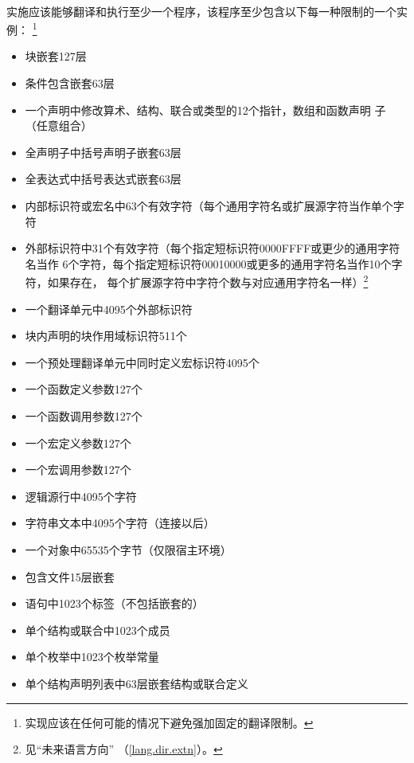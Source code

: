 \paragraph{}
实施应该能够翻译和执行至少一个程序，该程序至少包含以下每一种限制的一个实例：
\footnote{实现应该在任何可能的情况下避免强加固定的翻译限制。}
\begin{itemize}
  \item{块嵌套127层}
  \item{条件包含嵌套63层}
  \item{一个声明中修改算术、结构、联合或类型的12个指针，数组和函数声明
     子（任意组合）}
  \item{全声明子中括号声明子嵌套63层}
  \item{全表达式中括号表达式嵌套63层}
  \item{内部标识符或宏名中63个有效字符（每个通用字符名或扩展源字符当作单个字符}
  \item{外部标识符中31个有效字符（每个指定短标识符0000FFFF或更少的通用字符名当作
    6个字符，每个指定短标识符00010000或更多的通用字符名当作10个字符，如果存在，
    每个扩展源字符中字符个数与对应通用字符名一样）\footnote{见``未来语言方向''
    （\ref{lang.dir.extn}）。}}
  \item{一个翻译单元中4095个外部标识符}
  \item{块内声明的块作用域标识符511个}
  \item{一个预处理翻译单元中同时定义宏标识符4095个}
  \item{一个函数定义参数127个}
  \item{一个函数调用参数127个}
  \item{一个宏定义参数127个}
  \item{一个宏调用参数127个}
  \item{逻辑源行中4095个字符}
  \item{字符串文本中4095个字符（连接以后）}
  \item{一个对象中65535个字节（仅限宿主环境）}
  \item{包含文件15层嵌套}
  \item{语句中1023个标签（不包括嵌套的）}
  \item{单个结构或联合中1023个成员}
  \item{单个枚举中1023个枚举常量}
  \item{单个结构声明列表中63层嵌套结构或联合定义}
\end{itemize}

